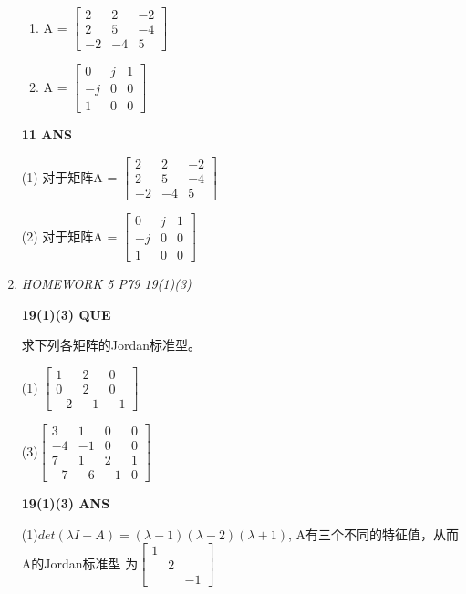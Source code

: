 \documentclass[11pt,letterpaper]{ctexart}
\begin{document}
\begin{enumerate}
\begin{enumerate}
	\item A = $\begin{bmatrix}
		2 & 2 & -2 \\
		2 & 5 & -4 \\
		-2 & -4 & 5  
		\end{bmatrix}$
	
	\item A = $\begin{bmatrix}
		0 & j & 1 \\
	-j & 0 & 0 \\
	1 & 0 & 0
	\end{bmatrix}$

\end{enumerate}




\textbf{11 ANS}
\bigskip

(1) 对于矩阵A = $\begin{bmatrix}
2 & 2 & -2 \\
2 & 5 & -4 \\
-2 & -4 & 5  
\end{bmatrix}$



(2) 对于矩阵A = $\begin{bmatrix}
0 & j & 1 \\
-j & 0 & 0 \\
1 & 0 & 0
\end{bmatrix}$


\item \textit{HOMEWORK 5 {P79 19(1)(3)}}%


\textbf{19(1)(3) QUE}
\bigskip

求下列各矩阵的Jordan标准型。

(1) $\begin{bmatrix}
	1 & 2 & 0 \\
0 & 2 & 0 \\
-2 & -1 & -1  
\end{bmatrix}$

(3)$\begin{bmatrix}
	3 & 1 & 0 & 0 \\
-4 & -1 & 0 & 0\\
7 & 1 & 2 & 1 \\
-7 & -6 & -1 & 0  
\end{bmatrix}$

\textbf{19(1)(3) ANS}
\bigskip


(1)$det(\lambda I - A) = (\lambda - 1)(\lambda - 2)(\lambda + 1)$, A有三个不同的特征值，从而A的Jordan标准型
为$\begin{bmatrix}
	1 &  &  \\
 & 2 &  \\
 &  & -1  
\end{bmatrix}$


\end{enumerate}
\end{document}
